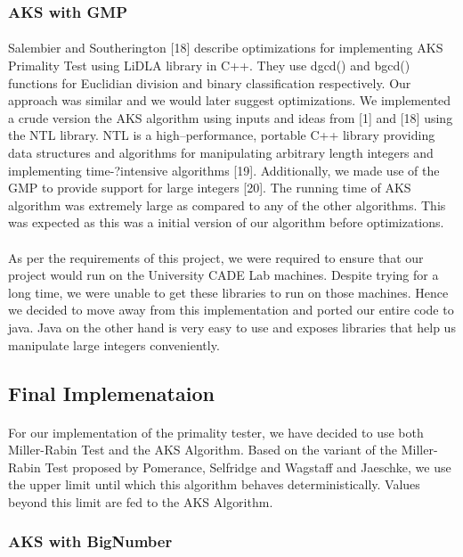 \documentclass[paper=a4, fontsize=11pt]{scrartcl}	%
\numberwithin{equation}{section}		%
\numberwithin{figure}{section}		%
\numberwithin{table}{section}		%
\begin{document}
\subsubsection{AKS with GMP}
\paragraph{}Salembier and Southerington [18] describe optimizations for implementing AKS Primality Test using LiDLA library in C++. They use dgcd() and bgcd() functions for Euclidian division and binary classification respectively. Our approach was  similar and we would later suggest optimizations. We implemented a crude version the AKS algorithm using inputs and ideas from [1] and [18] using the NTL library. NTL is a high--performance, portable C++ library providing data structures and algorithms for manipulating arbitrary length integers and implementing time-?intensive algorithms [19]. Additionally, we made use of the GMP to provide support for large integers [20]. The running time of AKS algorithm was extremely large as compared to any of the other algorithms. This was expected as this was a initial version of our algorithm before optimizations.
\paragraph{}As per the requirements of this project, we were required to ensure that our project would run on the University CADE Lab machines. Despite trying for a long time, we were unable to get these libraries to run on those machines. Hence we decided to move away from this implementation and ported our entire code to java. Java on the other hand is very easy to use and exposes libraries that help us manipulate large integers conveniently.

\subsection{Final Implemenataion}
\paragraph{}For our implementation of the primality tester, we have decided to use both Miller-Rabin Test and the AKS Algorithm. Based on the variant of the Miller-Rabin Test proposed by Pomerance, Selfridge and Wagstaff and Jaeschke, we use the upper limit until which this algorithm behaves deterministically. Values beyond this limit are fed to the AKS Algorithm.
\subsubsection{AKS with BigNumber}
\end{document}
